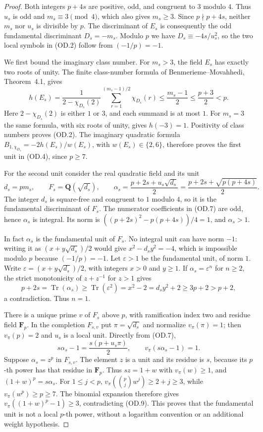 \documentclass[11pt,a4paper]{article}
\theoremstyle{definition}
\begin{document}
\begin{proof}
Both integers $p+4s$ are positive, odd, and congruent to $3$ modulo
$4$.  Thus $u_s$ is odd and $m_s\equiv3\pmod4$, which also gives
$m_s\geq3$.  Since $p\nmid p+4s$, neither $m_s$ nor $u_s$ is
divisible by $p$.  The discriminant of $E_s$ is consequently the
odd fundamental discriminant $D_s=-m_s$.  Modulo $p$ we have
$D_s\equiv-4s/u_s^2$, so the two local symbols in (OD.2) follow
from $(-1/p)=-1$.

We first bound the imaginary class number.  For $m_s>3$, the field
$E_s$ has exactly two roots of unity.  The finite class-number
formula of Benmerieme--Movahhedi, Theorem~4.1, gives
\[
 h(E_s)=\frac{1}{2-\chi_{D_s}(2)}
       \sum_{r=1}^{(m_s-1)/2}\chi_{D_s}(r)
 \leq\frac{m_s-1}{2}\leq\frac{p+3}{2}<p.                \tag{OD.6}
\]
Here $2-\chi_{D_s}(2)$ is either $1$ or $3$, and each summand
is at most $1$.  For $m_s=3$ the same formula, with six roots of
unity, gives $h(-3)=1$.  Positivity of class numbers proves (OD.2).
The imaginary quadratic formula
$B_{1,\chi_{D_s}}=-2h(E_s)/w(E_s)$, with $w(E_s)\in\{2,6\}$,
therefore proves the first unit in (OD.4), since $p\geq7$.

For the second unit consider the real quadratic field and its unit
\[
 d_s=pm_s,\qquad F_s=\mathbf Q(\sqrt{d_s}),\qquad
 \alpha_s=\frac{p+2s+u_s\sqrt{d_s}}2
          =\frac{p+2s+\sqrt{p(p+4s)}}2.                 \tag{OD.7}
\]
The integer $d_s$ is square-free and congruent to $1$ modulo $4$,
so it is the fundamental discriminant of $F_s$.  The numerator
coefficients in (OD.7) are odd, hence $\alpha_s$ is integral.
Its norm is $((p+2s)^2-p(p+4s))/4=1$, and $\alpha_s>1$.

In fact $\alpha_s$ is the fundamental unit of $F_s$.
No integral unit can have norm $-1$: writing it as
$(x+y\sqrt{d_s})/2$ would give $x^2-d_sy^2=-4$, which is
impossible modulo $p$ because $(-1/p)=-1$.  Let $\varepsilon>1$
be the fundamental unit, of norm $1$.  Write
$\varepsilon=(x+y\sqrt{d_s})/2$, with integers $x>0$ and
$y\geq1$.  If $\alpha_s=\varepsilon^n$ for $n\geq2$, the
strict monotonicity of $z+z^{-1}$ for $z>1$ gives
\[
 p+2s=\operatorname{Tr}(\alpha_s)
 \geq\operatorname{Tr}(\varepsilon^2)
 =x^2-2=d_sy^2+2\geq3p+2>p+2,                         \tag{OD.8}
\]
a contradiction.  Thus $n=1$.

There is a unique prime $v$ of $F_s$ above $p$, with ramification
index two and residue field $\mathbf F_p$.  In the completion
$F_{s,v}$ put $\pi=\sqrt{d_s}$ and normalize $v_\pi(\pi)=1$;
then $v_\pi(p)=2$ and $u_s$ is a local unit.  Directly from
(OD.7),
\[
 s\alpha_s-1=\frac{s(p+u_s\pi)}2,
 \qquad v_\pi(s\alpha_s-1)=1.                           \tag{OD.9}
\]
Suppose $\alpha_s=z^p$ in $F_{s,v}$.  The element $z$ is a unit
and its residue is $s$, because its $p$-th power has that residue
in $\mathbf F_p$.  Thus $sz=1+w$ with $v_\pi(w)\geq1$, and
$(1+w)^p=s\alpha_s$.  For $1\leq j<p$,
$v_\pi(\binom pj w^j)\geq2+j\geq3$, while
$v_\pi(w^p)\geq p\geq7$.  The binomial expansion therefore
gives $v_\pi((1+w)^p-1)\geq3$, contradicting (OD.9).
This proves that the fundamental unit is not a local $p$-th power,
without a logarithm convention or an additional weight hypothesis.


\end{proof}
\end{document}
